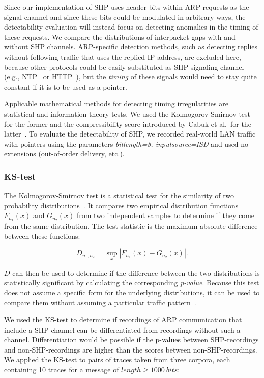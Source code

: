 \documentclass[journal]{IEEEtran}
\begin{document}
Since our implementation of \ac{SHP} uses header bits within \ac{ARP} requests as the signal channel and since these bits could be modulated in arbitrary ways, the detectability evaluation will instead focus on detecting anomalies in the timing of these requests. We compare the distributions of interpacket gaps with and without \ac{SHP} channels. \ac{ARP}-specific detection methods, such as detecting replies without following traffic that uses the replied \ac{IP}-address, are excluded here, because other protocols could be easily substituted as \ac{SHP}-signaling channel (e.g., NTP~\cite{hielscher2021systematic} or HTTP~\cite{morepackets21}), but the \textit{timing} of these signals would need to stay quite constant if it is to be used as a pointer.

Applicable mathematical methods for detecting timing irregularities are statistical and information-theory tests. We used the Kolmogorov-Smirnov test for the former and the compressibility score introduced by Cabuk et al.\ for the latter~\cite{epskappa24,keller2023improving,cabuk06}. To evaluate the detectability of \ac{SHP}, we recorded real-world \ac{LAN} traffic with pointers using the parameters \textit{bitlength=8, inputsource=ISD} and used no extensions (out-of-order delivery, etc.).

\subsubsection{KS-test}
The Kolmogorov-Smirnov test is a statistical test for the similarity of two probability distributions~\cite{Iglesias2017Are,smirnov48}. It compares two empirical distribution functions \( F_{n_1}(x) \) and \( G_{n_2}(x) \) from two independent samples to determine if they come from the same distribution. The test statistic is the maximum absolute difference between these functions:

\begin{equation}
\label{eqkomolgorov}
D_{n_1, n_2} = \sup_{x} \left| F_{n_1}(x) - G_{n_2}(x) \right|.
\end{equation}

$D$ can then be used to determine if the difference between the two distributions is statistically significant by calculating the corresponding \textit{p-value}. Because this test does not assume a specific form for the underlying distributions, it can be used to compare them without assuming a particular traffic pattern~\cite{Grzesiak2023Covert,Zhang2020A}. 

We used the KS-test to determine if recordings of \ac{ARP} communication that include a \ac{SHP} channel can be differentiated from recordings without such a channel. Differentiation would be possible if the p-values between \ac{SHP}-recordings and non-\ac{SHP}-recordings are higher than the scores between non-\ac{SHP}-recordings. We applied the KS-test to pairs of traces taken from three corpora, each containing 10 traces for a message of $length \geq 1000~bits$:
\end{document}
